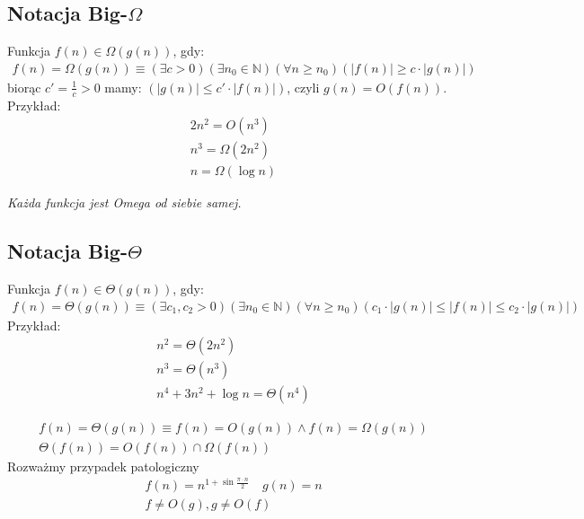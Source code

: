 \documentclass{article}
\numberwithin{equation}{subsection}
\newenvironment{definition}[1]{%
    \trivlist
    \item[\hskip\labelsep\textbf{Definition. #1.}]
    \ignorespaces
}{%
    \endtrivlist
}
\newenvironment{fact}[1]{%
    \trivlist
    \item[\hskip\labelsep\textbf{Fact. #1.}]
    \ignorespaces
}{%
    \endtrivlist
}
\begin{document}
\subsection{Notacja Big-$\Omega$}

\begin{definition}{Notacja Big-$\Omega$}
    Funkcja $f(n)\in \Omega(g(n))$, gdy:
    \begin{align}
        f(n) = \Omega(g(n)) \equiv 
        \left(\exists c>0\right)
        \left(\exists n_0\in\mathbb{N}\right)
        \left(\forall n\geq n_0\right)
        \left(|f(n)| \geq c \cdot |g(n)|\right)
    \end{align}
    \noindent
    biorąc $c' = \frac{1}{c} > 0$ mamy: $(|g(n)| \leq c' \cdot |f(n)|)$, czyli $g(n) = O(f(n))$.\\
    Przykład:
    \begin{align}
        2n^2 = O(n^3)\\
        n^3 = \Omega(2n^2)\\
        n = \Omega(\log n)
    \end{align}

    \noindent
    \textit{Każda funkcja jest Omega od siebie samej.}
\end{definition}

\subsection{Notacja Big-$\Theta$}

\begin{definition}{Notacja Big-$\Theta$}
    Funkcja $f(n)\in \Theta(g(n))$, gdy:
    \begin{align}
        f(n) = \Theta(g(n)) \equiv 
        \left(\exists c_1, c_2 > 0\right)
        \left(\exists n_0\in\mathbb{N}\right)
        \left(\forall n\geq n_0\right)
        \left(c_1 \cdot |g(n)| \leq |f(n)| \leq c_2 \cdot |g(n)|\right)
    \end{align}
    \noindent
    Przykład:
    \begin{align}
        n^2 = \Theta(2n^2)\\
        n^3 = \Theta(n^3)\\
        n^4 + 3n^2 + \log n = \Theta(n^4)
    \end{align}
\end{definition}

\begin{fact}{Dokładność zapisu Theta}
    \begin{align}
        f(n) = \Theta(g(n)) \equiv f(n) = O(g(n)) \land f(n) = \Omega(g(n))\\
        \Theta(f(n)) = O(f(n)) \cap \Omega(f(n))
    \end{align}
\end{fact}
Rozważmy przypadek patologiczny
\begin{align}
    f(n) = n^{1+\sin \frac{\pi \cdot n}{2}}\quad g(n) = n\\
    f\neq O(g), g\neq O(f)
\end{align}
\end{document}

